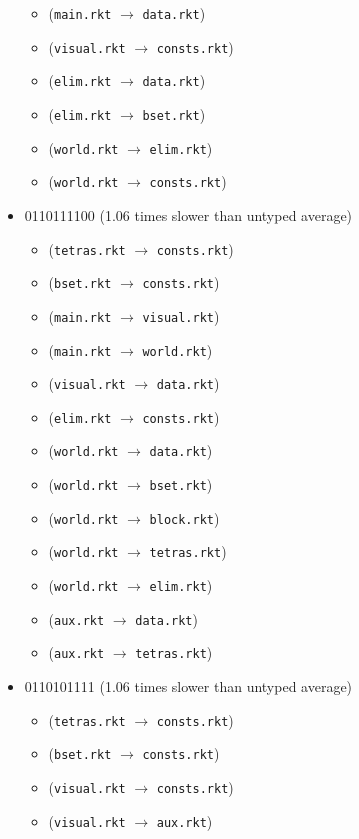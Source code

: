 \documentclass{article}
\newcommand{\mono}[1]{\texttt{#1}}
\begin{document}
\begin{itemize}
\begin{itemize}
  \item (\mono{main.rkt} $\rightarrow$ \mono{data.rkt})
  \item (\mono{visual.rkt} $\rightarrow$ \mono{consts.rkt})
  \item (\mono{elim.rkt} $\rightarrow$ \mono{data.rkt})
  \item (\mono{elim.rkt} $\rightarrow$ \mono{bset.rkt})
  \item (\mono{world.rkt} $\rightarrow$ \mono{elim.rkt})
  \item (\mono{world.rkt} $\rightarrow$ \mono{consts.rkt})
  \end{itemize}
\item 0110111100 (1.06 times slower than untyped average)
  \begin{itemize}
  \item (\mono{tetras.rkt} $\rightarrow$ \mono{consts.rkt})
  \item (\mono{bset.rkt} $\rightarrow$ \mono{consts.rkt})
  \item (\mono{main.rkt} $\rightarrow$ \mono{visual.rkt})
  \item (\mono{main.rkt} $\rightarrow$ \mono{world.rkt})
  \item (\mono{visual.rkt} $\rightarrow$ \mono{data.rkt})
  \item (\mono{elim.rkt} $\rightarrow$ \mono{consts.rkt})
  \item (\mono{world.rkt} $\rightarrow$ \mono{data.rkt})
  \item (\mono{world.rkt} $\rightarrow$ \mono{bset.rkt})
  \item (\mono{world.rkt} $\rightarrow$ \mono{block.rkt})
  \item (\mono{world.rkt} $\rightarrow$ \mono{tetras.rkt})
  \item (\mono{world.rkt} $\rightarrow$ \mono{elim.rkt})
  \item (\mono{aux.rkt} $\rightarrow$ \mono{data.rkt})
  \item (\mono{aux.rkt} $\rightarrow$ \mono{tetras.rkt})
  \end{itemize}
\item 0110101111 (1.06 times slower than untyped average)
  \begin{itemize}
  \item (\mono{tetras.rkt} $\rightarrow$ \mono{consts.rkt})
  \item (\mono{bset.rkt} $\rightarrow$ \mono{consts.rkt})
  \item (\mono{visual.rkt} $\rightarrow$ \mono{consts.rkt})
  \item (\mono{visual.rkt} $\rightarrow$ \mono{aux.rkt})

\end{itemize}
\end{itemize}
\end{document}

